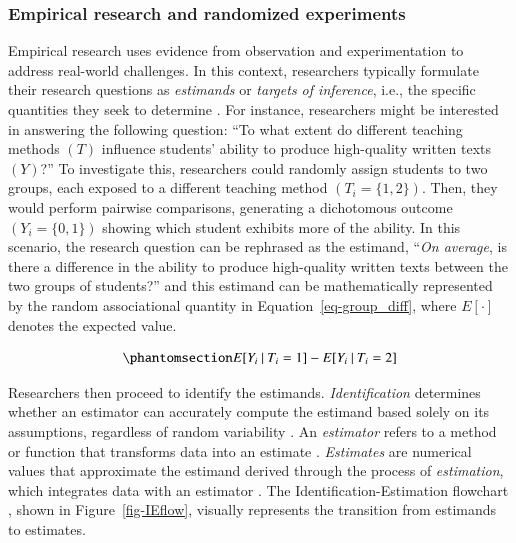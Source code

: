 \documentclass[
  authoryear,
  review,
  1p]{elsarticle}
\begin{document}
\subsubsection{Empirical research and randomized
experiments}\label{sec-appendixB1}

Empirical research uses evidence from observation and experimentation to
address real-world challenges. In this context, researchers typically
formulate their research questions as \emph{estimands} or \emph{targets
of inference}, i.e., the specific quantities they seek to determine
\citep{Everitt_et_al_2010}. For instance, researchers might be
interested in answering the following question: ``To what extent do
different teaching methods \((T)\) influence students' ability to
produce high-quality written texts \((Y)\)?'' To investigate this,
researchers could randomly assign students to two groups, each exposed
to a different teaching method \((T_{i} = \{1,2\})\). Then, they would
perform pairwise comparisons, generating a dichotomous outcome
\((Y_{i} = \{0,1\})\) showing which student exhibits more of the
ability. In this scenario, the research question can be rephrased as the
estimand, ``\emph{On average}, is there a difference in the ability to
produce high-quality written texts between the two groups of students?''
and this estimand can be mathematically represented by the random
associational quantity in Equation~\ref{eq-group_diff}, where
\(E[\cdot]\) denotes the expected value.

\begin{equation}\phantomsection\label{eq-group_diff}{
E[Y_{i} \:|\:T_{i}=1] - E[Y_{i} \:|\:T_{i}=2]
}\end{equation}

Researchers then proceed to identify the estimands.
\emph{Identification} determines whether an estimator can accurately
compute the estimand based solely on its assumptions, regardless of
random variability \citep[pp.~4]{Schuessler_et_al_2023}. An
\emph{estimator} refers to a method or function that transforms data
into an estimate \citep{Neal_2020}. \emph{Estimates} are numerical
values that approximate the estimand derived through the process of
\emph{estimation}, which integrates data with an estimator
\citep{Everitt_et_al_2010}. The Identification-Estimation flowchart
\citep{McElreath_2020, Neal_2020}, shown in Figure~\ref{fig-IEflow},
visually represents the transition from estimands to estimates.
\end{document}
